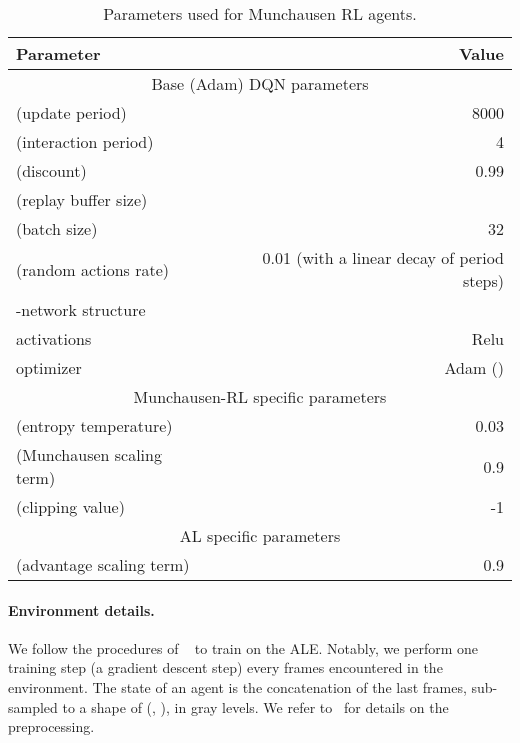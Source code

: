 \documentclass{article}
\begin{document}
\begin{table}[tbh]
    \centering
    \caption{Parameters used for Munchausen RL agents.}
    \begin{tabular}{l r}
    \toprule
    Parameter     & Value \\
    \midrule
    \multicolumn{2}{c}{Base (Adam) DQN parameters} \\
    \midrule
     (update period)    & 8000\\
     (interaction  period)    & 4\\
     (discount) & 0.99\\
     (replay buffer size) & \\
     (batch size) & 32 \\
     (random actions rate) & 0.01 (with a linear decay of period  steps)\\
    -network structure & \\
    activations & Relu\\
    optimizer & Adam () \\
    \midrule
    \multicolumn{2}{c}{Munchausen-RL specific parameters} \\
    \midrule
     (entropy temperature) & 0.03\\
     (Munchausen scaling term) & 0.9 \\
     (clipping value) & -1\\
    \midrule
    \multicolumn{2}{c}{AL specific parameters} \\
    \midrule
     (advantage scaling term) & 0.9 \\
    \bottomrule
    \end{tabular}
    \label{tab:hypers}
\end{table}








\paragraph{Environment details.} We follow the procedures of ~\citet{machado2018revisiting} to train on the ALE. Notably, we perform one training step (a gradient descent step) every  frames encountered in the environment. The state of an agent is the concatenation of the last  frames, sub-sampled to a shape of (, ), in gray levels. We refer to~\citet{machado2018revisiting} for details on the preprocessing.
\end{document}
